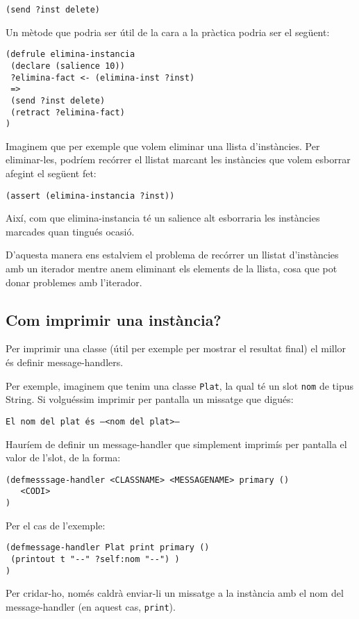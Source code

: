 \documentclass[11pt,svgnames]{scrbook}
\begin{document}
\texttt{(send ?inst delete)}
\medskip

Un mètode que podria ser útil de la cara a la pràctica podria ser el següent:

\begin{verbatim}
(defrule elimina-instancia
 (declare (salience 10))
 ?elimina-fact <- (elimina-inst ?inst)
 =>
 (send ?inst delete)
 (retract ?elimina-fact)
)\end{verbatim} 

Imaginem que per exemple que volem eliminar una llista d'instàncies. Per
eliminar-les, podríem recórrer el llistat marcant les instàncies que volem
esborrar afegint el següent fet:
\medskip

\texttt{(assert (elimina-instancia ?inst))}
\medskip

Així, com que elimina-instancia té un salience alt esborraria les instàncies
marcades quan tingués ocasió.

D'aquesta manera ens estalviem el problema de recórrer un llistat d'instàncies
amb un iterador mentre anem eliminant els elements de la llista, cosa que pot
donar problemes amb l'iterador.


\subsection{Com imprimir una instància?}


Per imprimir una classe (útil per exemple per mostrar el resultat final) el
millor és definir message-handlers.

Per exemple, imaginem que tenim una classe \texttt{Plat}, la qual té un slot
\texttt{nom} de tipus String. Si volguéssim imprimir per pantalla un
missatge que digués:
\medskip

\texttt{El nom del plat és --<nom del plat>--}
\medskip

Hauríem de definir un message-handler que simplement imprimís per pantalla el
valor de l'slot, de la forma:

\begin{verbatim}
(defmesssage-handler <CLASSNAME> <MESSAGENAME> primary ()
   <CODI>
)
\end{verbatim} 

Per el cas de l'exemple: 

\begin{verbatim}
(defmessage-handler Plat print primary ()
 (printout t "--" ?self:nom "--") )
)
\end{verbatim} 

Per cridar-ho, només caldrà enviar-li un missatge a la instància amb el nom del
message-handler (en aquest cas, \texttt{print}).
\medskip
\end{document}
